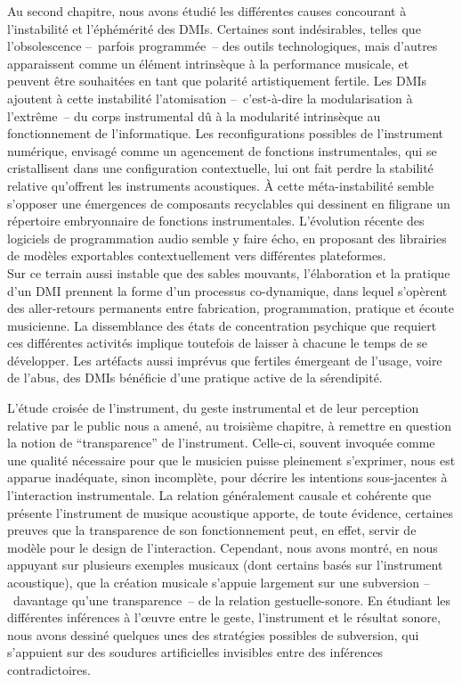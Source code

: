 \noindent Au second chapitre, nous avons étudié les différentes causes concourant à l'instabilité et l'éphémérité des \glspl{DMI}. Certaines sont indésirables, telles que l'obsolescence --~parfois programmée~-- des outils technologiques, mais d'autres apparaissent comme un élément intrinsèque à la performance musicale, et peuvent être souhaitées en tant que polarité artistiquement fertile. Les \glspl{DMI} ajoutent à cette instabilité l'atomisation --~c'est-à-dire la modularisation à l'extrême~-- du corps instrumental dû à la modularité intrinsèque au fonctionnement de l'informatique. Les reconfigurations possibles de l'instrument numérique, envisagé comme un agencement de fonctions instrumentales, qui se cristallisent dans une configuration contextuelle, lui ont fait perdre la stabilité relative qu'offrent les instruments acoustiques. À cette méta-instabilité semble s'opposer une émergences de composants recyclables qui dessinent en filigrane un répertoire embryonnaire de fonctions instrumentales. L'évolution récente des logiciels de programmation audio semble y faire écho, en proposant des librairies de modèles exportables contextuellement vers différentes plateformes.\\
\indent Sur ce terrain aussi instable que des sables mouvants, l'élaboration et la pratique d'un \gls{DMI} prennent la forme d'un processus co-dynamique, dans lequel s'opèrent des aller-retours permanents entre fabrication, programmation, pratique et écoute musicienne. La dissemblance des états de concentration psychique que requiert ces différentes activités implique toutefois de laisser à chacune le temps de se développer. Les artéfacts aussi imprévus que fertiles émergeant de l'usage, voire de l'abus, des \glspl{DMI} bénéficie d'une pratique active de la sérendipité.

\noindent L'étude croisée de l'instrument, du geste instrumental et de leur perception relative par le public nous a amené, au troisième chapitre, à remettre en question la notion de ``transparence'' de l'instrument. Celle-ci, souvent invoquée comme une qualité nécessaire pour que le musicien puisse pleinement s'exprimer, nous est apparue inadéquate, sinon incomplète, pour décrire les intentions sous-jacentes à l'interaction instrumentale. La relation généralement causale et cohérente que présente l'instrument de musique acoustique apporte, de toute évidence, certaines preuves que la transparence de son fonctionnement peut, en effet, servir de modèle pour le design de l'interaction. Cependant, nous avons montré, en nous appuyant sur plusieurs exemples musicaux (dont certains basés sur l'instrument acoustique), que la création musicale s'appuie largement sur une subversion --~davantage qu'une transparence~-- de la relation gestuelle-sonore. En étudiant les différentes inférences à l'œuvre entre le geste, l'instrument et le résultat sonore, nous avons dessiné quelques unes des stratégies possibles de subversion, qui s'appuient sur des soudures artificielles invisibles entre des inférences contradictoires.

